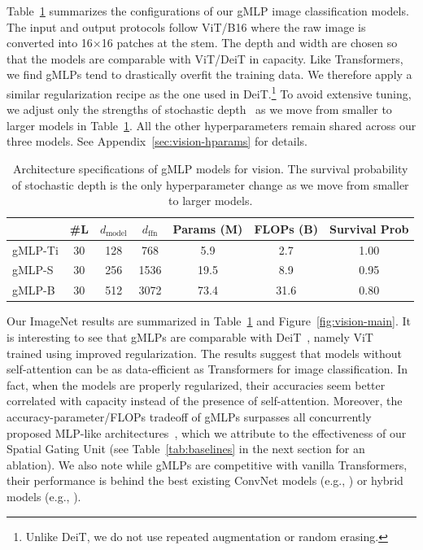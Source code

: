 \documentclass{article}
\newcommand{\gffn}{gMLP\xspace}
\begin{document}
Table~\ref{tab:vision-configs} summarizes the configurations of our \gffn image classification models. The input and output protocols follow ViT/B16 where the raw image is converted into 16$\times$16 patches at the stem. The depth and width are chosen so that the models are comparable with ViT/DeiT in capacity.
Like Transformers,
we find \gffn{s} tend to drastically overfit the training data.
We therefore apply a similar regularization recipe as the one used in DeiT.\footnote{Unlike DeiT, we do not use repeated augmentation or random erasing.}
To avoid extensive tuning, we adjust only the strengths of stochastic depth~\cite{huang2016deep} as we move from smaller to larger models in Table~\ref{tab:vision-configs}.
All the other hyperparameters remain shared across our three models.
See Appendix~\ref{sec:vision-hparams} for details.
\begin{table}[h]
\centering
\small
\caption{Architecture specifications of \gffn models for vision. The survival probability of stochastic depth is the only hyperparameter change as we move from smaller to larger models.}
\begin{tabular}{@{}l|ccc|cc|c@{}}
\toprule
\multicolumn{1}{c}{} & \#L & $d_\mathrm{model}$ & $d_\mathrm{ffn}$ & Params (M) & FLOPs (B) & Survival Prob \\ \midrule
\gffn-Ti & 30 & 128 & 768 & 5.9 & 2.7 & 1.00 \\
\gffn-S & 30 & 256 & 1536 & 19.5 & 8.9 & 0.95 \\
\gffn-B & 30 & 512 & 3072 & 73.4 & 31.6 & 0.80 \\ \bottomrule
\end{tabular}
\label{tab:vision-configs}
\end{table}
\vspace{-0.3cm}


Our ImageNet results are summarized in Table~\ref{tab:vision-configs} and Figure~\ref{fig:vision-main}.
It is interesting to see that
\gffn{s} are comparable with DeiT~\cite{touvron2020training},
namely ViT~\cite{dosovitskiy2020image} trained using improved regularization.
The results suggest that models without self-attention can be as data-efficient as Transformers for image classification.
In fact,
when the models are properly regularized, their accuracies seem better correlated with capacity instead of the presence of self-attention.
Moreover,
the accuracy-parameter/FLOPs tradeoff of
\gffn{s} surpasses all concurrently proposed MLP-like architectures~\cite{tolstikhin2021mlpmixer, melaskyriazi2021doyou, touvron2021resmlp},
which we attribute to the effectiveness of our Spatial Gating Unit (see Table~\ref{tab:baselines} in the next section for an ablation). We also note while \gffn{s} are competitive with vanilla Transformers, their performance is behind the best existing ConvNet models (e.g., \cite{brock2021high, tan2021efficientnetv2}) or hybrid models (e.g., \cite{bello2021lambdanetworks, vaswani2021scaling, srinivas2021bottleneck, wu2021cvt, liu2021swin}).
\end{document}
